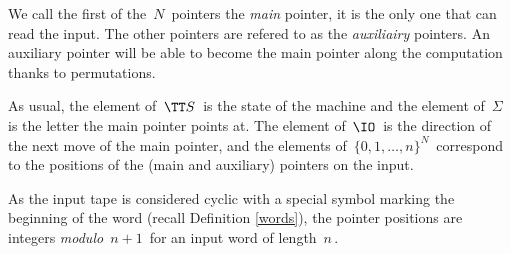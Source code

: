 We call the first of the $\,N\,$ pointers the \emph{main} pointer, it is the only one that can read the input.
The other pointers are refered to as the \emph{auxiliairy} pointers.
An auxiliary pointer will be able to become the main pointer along the computation thanks to permutations.


As usual, the element of $\,\TT S\,$ is the state of the machine and the element of $\,\Sigma\,$ is the letter the main pointer points at.
The element of $\,\IO\,$ is the direction of the next move of the main pointer, and the elements of $\,\{0,1,\dots,n\}^N\,$ correspond to the positions of the (main and auxiliary)  pointers on the input.

\smallskip

As the input tape is considered cyclic with a special symbol marking the beginning of the word (recall Definition \ref{words}), the pointer positions are integers \emph{modulo} $\,n+1\,$ for an input word of length $\,n\,$.

